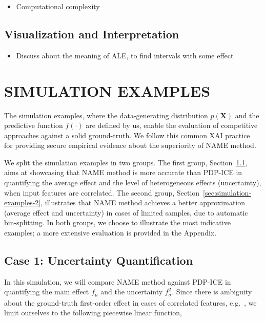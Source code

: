 \documentclass[twoside]{article}
\begin{document}
\noindent

\begin{itemize}
\item Computational complexity
\end{itemize}

\subsection{Visualization and Interpretation}
\label{sec:visualization}

\begin{itemize}
\item Discuss about the meaning of ALE, to find intervals with some effect
\end{itemize}

\clearpage
\section{SIMULATION EXAMPLES}
\label{sec:simulation-examples}

The simulation examples, where the data-generating distribution
\(p(\mathbf{X})\) and the predictive function \(f(\cdot)\) are defined
by us, enable the evaluation of competitive approaches against a solid
ground-truth. We follow this common XAI
practice~\citep{aas2021explaining, herbinger2022repid} for providing
secure empirical evidence about the superiority of NAME method.

We split the simulation examples in two groups. The first group,
Section~\ref{sec:simulation-examples-1}, aims at showcasing that NAME
method is more accurate than PDP-ICE in quantifying the average effect
and the level of heterogeneous effects (uncertainty), when input
features are correlated. The second group,
Section~\ref{sec:simulation-examples-2}, illustrates that NAME method
achieves a better approximation (average effect and uncertainty) in
cases of limited samples, due to automatic bin-splitting. In both
groups, we choose to illustrate the most indicative examples; a more
extensive evaluation is provided in the Appendix.

\subsection{Case 1: Uncertainty Quantification}
\label{sec:simulation-examples-1}

In this simulation, we will compare NAME method against PDP-ICE in
quantifying the main effect \(f_\mu\) and the uncertainty
\(f_\sigma^2\). Since there is ambiguity about the ground-truth
first-order effect in cases of correlated
features, e.g.~\citep{apley2020visualizing,Gromping2020MAEP}, we limit
ourselves to the following piecewise linear function,
\end{document}
